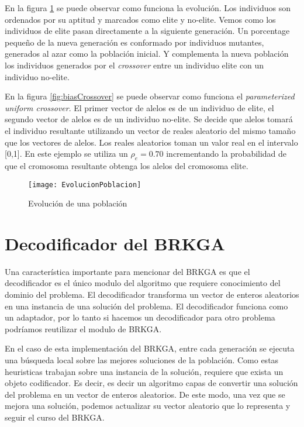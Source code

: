 \bigskip

En la figura \ref{fig:evolucion} se puede observar como funciona la evolución. Los individuos son ordenados por su aptitud y marcados como elite y no-elite. Vemos como los individuos de elite pasan directamente a la siguiente generación. Un porcentage pequeño de la nueva generación es conformado por individuos mutantes, generados al azar como la población inicial. Y complementa la nueva población los individuos generados por el \textit{crossover} entre un individuo elite con un individuo no-elite. 

\bigskip

En la figura \ref{fig:biasCrossover} se puede observar como funciona el \textit{parameterized uniform crossover}. El primer vector de alelos es de un individuo de elite, el segundo vector de alelos es de un individuo no-elite. Se decide que alelos tomará el individuo resultante utilizando un vector de reales aleatorio del mismo tamaño que los vectores de alelos. Los reales aleatorios toman un valor real en el intervalo [0,1]. En este ejemplo se utiliza un $\rho_e = 0.70$ incrementando la probabilidad de que el cromosoma resultante obtenga los alelos del cromosoma elite.

\begin{figure}[h]
	\caption{Evolución de una población}
	\centering
	\texttt{[image: EvolucionPoblacion]}
	\label{fig:evolucion}
\end{figure}

\section{Decodificador del BRKGA}

Una característica importante para mencionar del BRKGA es que el decodificador es el único modulo del algoritmo que requiere conocimiento del dominio del problema. El decodificador transforma un vector de enteros aleatorios en una instancia de una solución del problema. El decodificador funciona como un adaptador, por lo tanto si hacemos un decodificador para otro problema podríamos reutilizar el modulo de BRKGA.

\bigskip

En el caso de esta implementación del BRKGA, entre cada generación se ejecuta una búsqueda local sobre las mejores soluciones de la población. Como estas heuristicas trabajan sobre una instancia de la solución, requiere que exista un objeto codificador. Es decir, es decir un algoritmo capas de convertir una solución del problema en un vector de enteros aleatorios. De este modo, una vez que se mejora una solución, podemos actualizar su vector aleatorio que lo representa y seguir el curso del BRKGA. 

